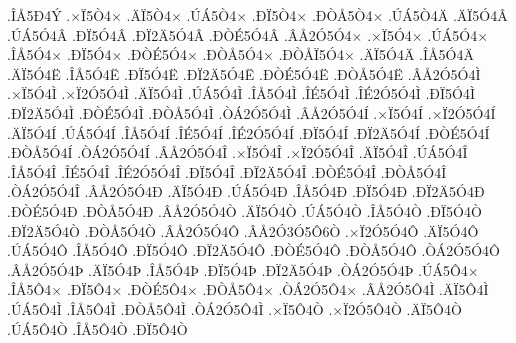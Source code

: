{.^^ce^^c55^^d04^^dd
.^^d7^^cf5^^d24^^d7
.^^c4^^cf5^^d24^^d7
.^^da^^c15^^d24^^d7
.^^d0^^cf5^^d24^^d7
.^^d0^^d2^^c55^^d24^^d7
.^^da^^c15^^d24^^c4
.^^c4^^cf5^^d34^^c2
.^^da^^c15^^d34^^c2
.^^d0^^cf5^^d34^^c2
.^^d0^^cf2^^c45^^d34^^c2
.^^d0^^d2^^c95^^d34^^c2
.^^c2^^c52^^d35^^d34^^d7
.^^d7^^cf5^^d34^^d7
.^^da^^c15^^d34^^d7
.^^ce^^c55^^d34^^d7
.^^d0^^cf5^^d34^^d7
.^^d0^^d2^^c95^^d34^^d7
.^^d0^^d2^^c55^^d34^^d7
.^^d0^^d2^^c5^^cf5^^d34^^d7
.^^c4^^cf5^^d34^^c4
.^^ce^^c55^^d34^^c4
.^^c4^^cf5^^d34^^cb
.^^ce^^c55^^d34^^cb
.^^d0^^cf5^^d34^^cb
.^^d0^^cf2^^c45^^d34^^cb
.^^d0^^d2^^c95^^d34^^cb
.^^d0^^d2^^c55^^d34^^cb
.^^c2^^c52^^d35^^d34^^cc
.^^d7^^cf5^^d34^^cc
.^^d7^^cf2^^d35^^d34^^cc
.^^c4^^cf5^^d34^^cc
.^^da^^c15^^d34^^cc
.^^ce^^c55^^d34^^cc
.^^ce^^c95^^d34^^cc
.^^ce^^c92^^d35^^d34^^cc
.^^d0^^cf5^^d34^^cc
.^^d0^^cf2^^c45^^d34^^cc
.^^d0^^d2^^c95^^d34^^cc
.^^d0^^d2^^c55^^d34^^cc
.^^d2^^c12^^d35^^d34^^cc
.^^c2^^c52^^d35^^d34^^cd
.^^d7^^cf5^^d34^^cd
.^^d7^^cf2^^d35^^d34^^cd
.^^c4^^cf5^^d34^^cd
.^^da^^c15^^d34^^cd
.^^ce^^c55^^d34^^cd
.^^ce^^c95^^d34^^cd
.^^ce^^c92^^d35^^d34^^cd
.^^d0^^cf5^^d34^^cd
.^^d0^^cf2^^c45^^d34^^cd
.^^d0^^d2^^c95^^d34^^cd
.^^d0^^d2^^c55^^d34^^cd
.^^d2^^c12^^d35^^d34^^cd
.^^c2^^c52^^d35^^d34^^ce
.^^d7^^cf5^^d34^^ce
.^^d7^^cf2^^d35^^d34^^ce
.^^c4^^cf5^^d34^^ce
.^^da^^c15^^d34^^ce
.^^ce^^c55^^d34^^ce
.^^ce^^c95^^d34^^ce
.^^ce^^c92^^d35^^d34^^ce
.^^d0^^cf5^^d34^^ce
.^^d0^^cf2^^c45^^d34^^ce
.^^d0^^d2^^c95^^d34^^ce
.^^d0^^d2^^c55^^d34^^ce
.^^d2^^c12^^d35^^d34^^ce
.^^c2^^c52^^d35^^d34^^d0
.^^c4^^cf5^^d34^^d0
.^^da^^c15^^d34^^d0
.^^ce^^c55^^d34^^d0
.^^d0^^cf5^^d34^^d0
.^^d0^^cf2^^c45^^d34^^d0
.^^d0^^d2^^c95^^d34^^d0
.^^d0^^d2^^c55^^d34^^d0
.^^c2^^c52^^d35^^d34^^d2
.^^c4^^cf5^^d34^^d2
.^^da^^c15^^d34^^d2
.^^ce^^c55^^d34^^d2
.^^d0^^cf5^^d34^^d2
.^^d0^^cf2^^c45^^d34^^d2
.^^d0^^d2^^c55^^d34^^d2
.^^c2^^c52^^d35^^d34^^d4
.^^c2^^c52^^d33^^d35^^d46^^d2
.^^d7^^cf2^^d35^^d34^^d4
.^^c4^^cf5^^d34^^d4
.^^da^^c15^^d34^^d4
.^^ce^^c55^^d34^^d4
.^^d0^^cf5^^d34^^d4
.^^d0^^cf2^^c45^^d34^^d4
.^^d0^^d2^^c95^^d34^^d4
.^^d0^^d2^^c55^^d34^^d4
.^^d2^^c12^^d35^^d34^^d4
.^^c2^^c52^^d35^^d34^^de
.^^c4^^cf5^^d34^^de
.^^ce^^c55^^d34^^de
.^^d0^^cf5^^d34^^de
.^^d0^^cf2^^c45^^d34^^de
.^^d2^^c12^^d35^^d34^^de
.^^da^^c15^^d44^^d7
.^^ce^^c55^^d44^^d7
.^^d0^^cf5^^d44^^d7
.^^d0^^d2^^c95^^d44^^d7
.^^d0^^d2^^c55^^d44^^d7
.^^d2^^c12^^d35^^d44^^d7
.^^c2^^c52^^d35^^d44^^cc
.^^c4^^cf5^^d44^^cc
.^^da^^c15^^d44^^cc
.^^ce^^c55^^d44^^cc
.^^d0^^d2^^c55^^d44^^cc
.^^d2^^c12^^d35^^d44^^cc
.^^d7^^cf5^^d44^^d2
.^^d7^^cf2^^d35^^d44^^d2
.^^c4^^cf5^^d44^^d2
.^^da^^c15^^d44^^d2
.^^ce^^c55^^d44^^d2
.^^d0^^cf5^^d44^^d2
}

